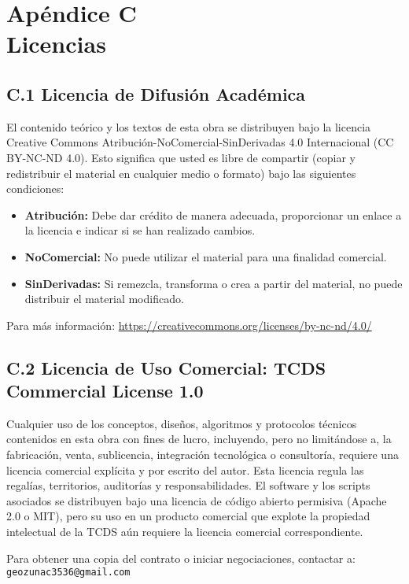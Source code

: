\documentclass[12pt,openright]{book}
\begin{document}
\clearpage

\chapter*{Apéndice C \\ Licencias}

\section*{C.1 Licencia de Difusión Académica}
El contenido teórico y los textos de esta obra se distribuyen bajo la licencia Creative Commons Atribución-NoComercial-SinDerivadas 4.0 Internacional (CC BY-NC-ND 4.0). Esto significa que usted es libre de compartir (copiar y redistribuir el material en cualquier medio o formato) bajo las siguientes condiciones:
\begin{itemize}
  \item \textbf{Atribución:} Debe dar crédito de manera adecuada, proporcionar un enlace a la licencia e indicar si se han realizado cambios.
  \item \textbf{NoComercial:} No puede utilizar el material para una finalidad comercial.
  \item \textbf{SinDerivadas:} Si remezcla, transforma o crea a partir del material, no puede distribuir el material modificado.
\end{itemize}
Para más información: \url{https://creativecommons.org/licenses/by-nc-nd/4.0/}

\section*{C.2 Licencia de Uso Comercial: TCDS Commercial License 1.0}
Cualquier uso de los conceptos, diseños, algoritmos y protocolos técnicos contenidos en esta obra con fines de lucro, incluyendo, pero no limitándose a, la fabricación, venta, sublicencia, integración tecnológica o consultoría, requiere una licencia comercial explícita y por escrito del autor. Esta licencia regula las regalías, territorios, auditorías y responsabilidades. El software y los scripts asociados se distribuyen bajo una licencia de código abierto permisiva (Apache 2.0 o MIT), pero su uso en un producto comercial que explote la propiedad intelectual de la TCDS aún requiere la licencia comercial correspondiente.

\noindent Para obtener una copia del contrato o iniciar negociaciones, contactar a: \texttt{geozunac3536@gmail.com}
\end{document}
